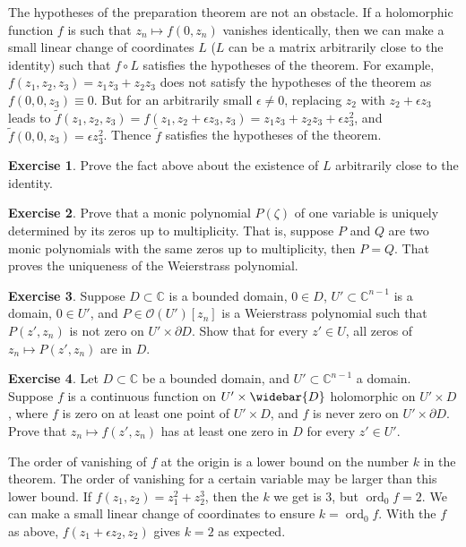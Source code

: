 \documentclass[12pt,openany]{book}
\newcommand{\ord}{\operatorname{ord}}
\newcommand{\C}{{\mathbb{C}}}
\newcommand{\sO}{{\mathscr{O}}}
\theoremstyle{plain}
\theoremstyle{remark}
\theoremstyle{definition}
\newenvironment{exbox}{%
    \def\FrameCommand{\vrule width 1pt \relax\hspace{10pt}}%
    \MakeFramed{\advance\hsize-\width\FrameRestore}%
}{%
    \endMakeFramed
}
\theoremstyle{exercise}
\newtheorem{exercise}{Exercise}[section]
\theoremstyle{example}
\begin{document}
The hypotheses of the preparation theorem are not an obstacle.  If a holomorphic
function $f$ is such that $z_n \mapsto f(0,z_n)$ vanishes identically,
then we can make a small linear change of
coordinates $L$ ($L$ can be a matrix arbitrarily close to the identity) such
that $f \circ L$ satisfies the hypotheses of the theorem.
For example, $f(z_1,z_2,z_3) = z_1z_3+z_2z_3$ does not satisfy the
hypotheses of the theorem as $f(0,0,z_3) \equiv 0$.  But for an arbitrarily
small $\epsilon \not= 0$, replacing
$z_2$ with $z_2 + \epsilon z_3$ leads to $\tilde{f}(z_1,z_2,z_3)
= f(z_1,z_2+\epsilon z_3,z_3) =
z_1z_3+z_2z_3 + \epsilon z_3^2$, and $\tilde{f}(0,0,z_3) = \epsilon z_3^2$.
Thence $\tilde{f}$
satisfies the hypotheses of the theorem.

\begin{exbox}
\begin{exercise}
Prove the fact above about the existence of $L$ arbitrarily close to the
identity.
\end{exercise}

\begin{exercise}
Prove that a monic polynomial $P(\zeta)$ of one variable is
uniquely determined by its zeros up to multiplicity.  That is, suppose
$P$ and $Q$ are two monic polynomials with the same zeros
up to multiplicity,
then $P=Q$.  That proves the uniqueness of the Weierstrass polynomial.
\end{exercise}

\begin{exercise}
Suppose $D \subset \C$ is a bounded domain, $0 \in D$,
$U' \subset \C^{n-1}$ is a domain, $0 \in U'$,
and $P \in \sO(U')[z_n]$ is a Weierstrass polynomial
such that $P(z',z_n)$ is not zero on $U' \times \partial D$.
Show that for every $z' \in U$, all zeros of $z_n \mapsto P(z',z_n)$ are in $D$.
\end{exercise}

\begin{exercise}
Let $D \subset \C$ be a bounded domain,
and
$U' \subset \C^{n-1}$ a domain.
Suppose
$f$ is a continuous function on
$U' \times \widebar{D}$ holomorphic on $U' \times D$,
where $f$ is zero on at least one point
of $U' \times D$, and $f$ is never zero on
$U' \times \partial D$.
Prove that
$z_n \mapsto f(z',z_n)$ has at least one zero in $D$ for every $z' \in U'$.
\end{exercise}
\end{exbox}

\pagebreak[2]
The order of vanishing of $f$ at the origin is a lower bound
on the number $k$ in the theorem.  The order of vanishing for a certain
variable may be larger than this lower bound.  If $f(z_1,z_2) =
z_1^2 + z_2^3$, then the $k$ we get is 3, but $\ord_0 f = 2$.
We can make a small
linear change of coordinates to ensure $k = \ord_0 f$.
With the $f$ as above, $f(z_1 + \epsilon z_2,z_2)$ gives $k = 2$
as expected.
\end{document}
